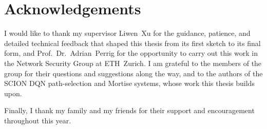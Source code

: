 \chapter*{Acknowledgements}

I would like to thank my supervisor Liwen~Xu for the guidance, patience, and detailed technical feedback
that shaped this thesis from its first sketch to its final form, and Prof.~Dr.~Adrian~Perrig for the
opportunity to carry out this work in the Network Security Group at ETH~Zurich. I am grateful to the
members of the group for their questions and suggestions along the way, and to the authors of the SCION
DQN path-selection and Mortise systems, whose work this thesis builds upon.

Finally, I thank my family and my friends for their support and encouragement throughout this year.
